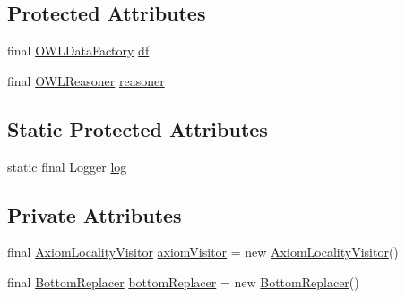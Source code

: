 \subsection*{Protected Attributes}
\begin{DoxyCompactItemize}
\item 
final \hyperlink{interfaceorg_1_1semanticweb_1_1owlapi_1_1model_1_1_o_w_l_data_factory}{O\-W\-L\-Data\-Factory} \hyperlink{classcom_1_1clarkparsia_1_1owlapi_1_1modularity_1_1locality_1_1_semantic_locality_evaluator_a1099c8ebe14e320900bbbf3a47347135}{df}
\item 
final \hyperlink{interfaceorg_1_1semanticweb_1_1owlapi_1_1reasoner_1_1_o_w_l_reasoner}{O\-W\-L\-Reasoner} \hyperlink{classcom_1_1clarkparsia_1_1owlapi_1_1modularity_1_1locality_1_1_semantic_locality_evaluator_a6761f79cd9080669e2d4adc25bbf77f9}{reasoner}
\end{DoxyCompactItemize}
\subsection*{Static Protected Attributes}
\begin{DoxyCompactItemize}
\item 
static final Logger \hyperlink{classcom_1_1clarkparsia_1_1owlapi_1_1modularity_1_1locality_1_1_semantic_locality_evaluator_a7e4aff3c7cc1b70b573351ae88eb7be2}{log}
\end{DoxyCompactItemize}
\subsection*{Private Attributes}
\begin{DoxyCompactItemize}
\item 
final \hyperlink{classcom_1_1clarkparsia_1_1owlapi_1_1modularity_1_1locality_1_1_semantic_locality_evaluator_1_1_axiom_locality_visitor}{Axiom\-Locality\-Visitor} \hyperlink{classcom_1_1clarkparsia_1_1owlapi_1_1modularity_1_1locality_1_1_semantic_locality_evaluator_af01d8498ad15c1a90993466e4d035838}{axiom\-Visitor} = new \hyperlink{classcom_1_1clarkparsia_1_1owlapi_1_1modularity_1_1locality_1_1_semantic_locality_evaluator_1_1_axiom_locality_visitor}{Axiom\-Locality\-Visitor}()
\item 
final \hyperlink{classcom_1_1clarkparsia_1_1owlapi_1_1modularity_1_1locality_1_1_semantic_locality_evaluator_1_1_bottom_replacer}{Bottom\-Replacer} \hyperlink{classcom_1_1clarkparsia_1_1owlapi_1_1modularity_1_1locality_1_1_semantic_locality_evaluator_afac08e014ecb39cdd4af38468bcd169e}{bottom\-Replacer} = new \hyperlink{classcom_1_1clarkparsia_1_1owlapi_1_1modularity_1_1locality_1_1_semantic_locality_evaluator_1_1_bottom_replacer}{Bottom\-Replacer}()
\end{DoxyCompactItemize}


